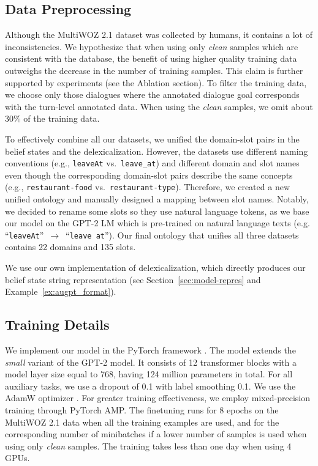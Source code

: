 \documentclass[11pt,a4paper]{article}
\newcommand{\exampleref}[1]{Example~\ref{#1}}
\newcommand{\multiwozn}[0]{MultiWOZ 2.1\xspace}
\newcommand{\code}[1]{\texttt{#1}}
\begin{document}
\subsection{Data Preprocessing}\label{sec:preprocessing}

Although the MultiWOZ 2.1 dataset was collected by humans, it contains a lot of inconsistencies. We hypothesize that when using only \textit{clean} samples which are consistent with the database, the benefit of using higher quality training data outweighs the decrease in the number of training samples. This claim is further supported by experiments (see the Ablation section). To filter the training data, we choose only those dialogues where the annotated dialogue goal corresponds with the turn-level annotated data. When using the \emph{clean} samples, we omit about 30\% of the training data.


To effectively combine all our datasets, we unified the domain-slot pairs in the belief states and the delexicalization.
%
However, the datasets use different naming conventions (e.g., \code{leaveAt} vs.\ \code{leave\_at}) and different domain and slot names even though the corresponding domain-slot pairs describe the same concepts (e.g., \code{restaurant-food} vs.\ \code{restaurant-type}). Therefore, we created a new unified ontology and manually designed a mapping between slot names. Notably, we decided to rename some slots so they use natural language tokens, as we base our model on the GPT-2 LM which is pre-trained on natural language texts (e.g. ``\code{leaveAt}''~$\rightarrow$~``\code{leave at}'').
Our final ontology that unifies all three datasets contains 22 domains and 135 slots. %

We use our own implementation of delexicalization, which directly produces our belief state string representation (see Section~\ref{sec:model-repres} and \exampleref{ex:augpt_format}). %


\subsection{Training Details}

We implement our model in the PyTorch framework \cite{pytorch}.
The model extends the \emph{small} variant of the GPT-2 model.
It consists of 12 transformer blocks with a model layer size equal to 768, having 124 million parameters in total.
For all auxiliary tasks, we use a dropout of 0.1 with label smoothing 0.1.
We use the AdamW optimizer \cite{loshchilov2017decoupled}.
For greater training effectiveness, we employ mixed-precision training \cite{micikevicius2017} through PyTorch AMP. 
The finetuning runs for 8 epochs on the \multiwozn data when all the training examples are used, and for the corresponding number of minibatches if a lower number of samples is used when using only \emph{clean} samples.
The training takes less than one day when using 4 GPUs.
\end{document}
